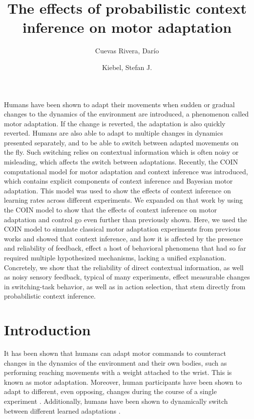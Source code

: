 \documentclass[a4paper,doc,floatsintext,natbib]{apa6}
\title{The effects of probabilistic context inference on motor adaptation}
\author[1,2]{Cuevas Rivera, Darío}
\author[1,2]{Kiebel, Stefan J.}
\affil[1]{Chair of Neuroimaging, Faculty of Psychology, Technische Universität Dresden, 01062 Dresden, Germany.}
\affil[2]{Centre for Tactile Internet with Human-in-the-Loop (CeTI)}
\affiliation{~}
\begin{document}
\maketitle

Humans have been shown to adapt their movements when sudden or gradual changes to the dynamics of the environment are introduced, a phenomenon called motor adaptation. If the change is reverted, the adaptation is also quickly reverted. Humans are also able to adapt to multiple changes in dynamics presented separately, and to be able to switch between adapted movements on the fly. Such switching relies on contextual information which is often noisy or misleading, which affects the switch between adaptations. Recently, the COIN computational model for motor adaptation and context inference was introduced, which contains explicit components of context inference and Bayesian motor adaptation. This model was used to show the effects of context inference on learning rates across different experiments. We expanded on that work by using the COIN model to show that the effects of context inference on motor adaptation and control go even further than previously shown. Here, we used the COIN model to simulate classical motor adaptation experiments from previous works and showed that context inference, and how it is affected by the presence and reliability of feedback, effect a host of behavioral phenomena that had so far required multiple hypothesized mechanisms, lacking a unified explanation. Concretely, we show that the reliability of direct contextual information, as well as noisy sensory feedback, typical of many experiments, effect measurable changes in switching-task behavior, as well as in action selection, that stem directly from probabilistic context inference. 


\section{Introduction}
It has been shown that humans can adapt motor commands to counteract changes in the dynamics of the environment and their own bodies, such as performing reaching movements with a weight attached to the wrist. This is known as motor adaptation. Moreover, human participants have been shown to adapt to different, even opposing, changes during the course of a single experiment \citep{Gandolfo_Motor_1996,Shadmehr_Functional_1997}. Additionally, humans have been shown to dynamically switch between different learned adaptations \citep{Davidson_Scaling_2004,Ethier_Spontaneous_2008,Lee_Dual_2009}.
\end{document}
